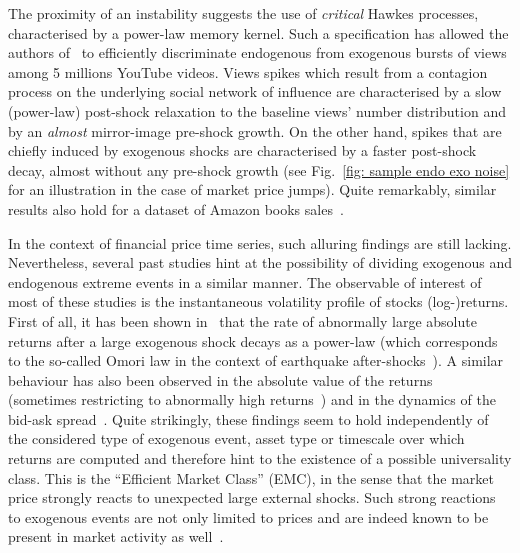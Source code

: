 \documentclass[amsmath,amssymb,aps,pre,floatfix,twocolumn,superscriptaddress]{revtex4}
\begin{document}
The proximity of an instability suggests the use of {\it critical} Hawkes processes, characterised by a power-law memory kernel. Such a specification has allowed the authors of~\cite{sornette_youtube} to efficiently discriminate endogenous from exogenous bursts of views among 5 millions YouTube videos. Views spikes which result from a contagion process on the underlying social network of influence are characterised by a slow (power-law) post-shock relaxation to the baseline views' number distribution and by an \emph{almost} mirror-image pre-shock growth. On the other hand, spikes that are chiefly induced by exogenous shocks are characterised by a faster post-shock decay, almost without any pre-shock growth (see Fig.~\ref{fig: sample endo exo noise} for an illustration in the case of market price jumps). Quite remarkably, similar results also hold for a dataset of Amazon books sales~\cite{sornette_books,amazon_book_sornette_long}. 

In the context of financial price time series, such alluring findings are still lacking. Nevertheless, several past studies hint at the possibility of dividing exogenous and endogenous extreme events in a similar manner. The observable of interest of most of these studies is the instantaneous volatility profile of stocks (log-)returns. First of all, it has been shown in~\cite{lillo_mantegna_pl,omori_law_1,omori_law_2,lillo_mantegna_2,pl_relax_2,zawadowski2006short} that the rate of abnormally large absolute returns after a large exogenous shock decays as a power-law (which corresponds to the so-called Omori law in the context of earthquake after-shocks~\cite{utsu_omori}). A similar behaviour has also been observed in the absolute value of the returns~\cite{lillo_mantegna_pl,vol_forecasting} (sometimes restricting to abnormally high returns~\cite{pl_relax_1,pl_relax_2,pl_time_asymmetry}) and in the dynamics of the bid-ask spread~\cite{pl_bid_ask,zawadowski2006short}. Quite strikingly, these findings seem to hold independently of the considered type of exogenous event, asset type or timescale over which returns are computed and therefore hint to the existence of a possible universality class. This is the ``Efficient Market Class'' (EMC), in the sense that the market price strongly reacts to unexpected large external shocks. Such strong reactions to exogenous events are not only limited to prices and are indeed known to be present in market activity as well~\cite{hisano2013high,lillo_news_hawkes_activity}.
\end{document}
